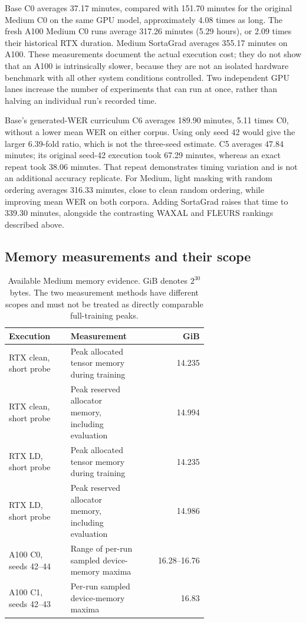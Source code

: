 \documentclass[12pt,a4paper]{report}
\begin{document}
Base C0 averages 37.17 minutes, compared with 151.70 minutes for the
original Medium C0 on the same GPU model, approximately 4.08 times as long.
The fresh A100 Medium C0 runs average 317.26 minutes (5.29 hours), or
2.09 times their historical RTX duration. Medium SortaGrad averages 355.17
minutes on A100. These measurements document the actual execution cost;
they do not show that an A100 is intrinsically slower, because they are not
an isolated hardware benchmark with all other system conditions controlled.
Two independent GPU lanes increase the number of experiments that can run
at once, rather than halving an individual run's recorded time.

Base's generated-WER curriculum C6 averages 189.90 minutes, 5.11 times
C0, without a lower mean WER on either corpus. Using only seed 42 would
give the larger 6.39-fold ratio, which is not the three-seed estimate.
C5 averages 47.84 minutes; its original seed-42 execution took 67.29 minutes,
whereas an exact repeat took 38.06 minutes. That repeat demonstrates timing
variation and is not an additional accuracy replicate. For Medium, light
masking with random ordering averages 316.33 minutes, close to clean random
ordering, while improving mean WER on both corpora. Adding SortaGrad raises
that time to 339.30 minutes, alongside the contrasting WAXAL and FLEURS
rankings described above.

\subsection{Memory measurements and their scope}

\begin{table}[htbp]\centering\small
\caption{Available Medium memory evidence. GiB denotes $2^{30}$ bytes.
The two measurement methods have different scopes and must not be treated
as directly comparable full-training peaks.}
\label{tab:memory}
\begin{tabular}{p{0.31\linewidth}p{0.36\linewidth}r}\toprule
Execution & Measurement & GiB\\\midrule
RTX clean, short probe & Peak allocated tensor memory during training & 14.235\\
RTX clean, short probe & Peak reserved allocator memory, including evaluation & 14.994\\
RTX LD, short probe & Peak allocated tensor memory during training & 14.235\\
RTX LD, short probe & Peak reserved allocator memory, including evaluation & 14.986\\
A100 C0, seeds 42--44 & Range of per-run sampled device-memory maxima & 16.28--16.76\\
A100 C1, seeds 42--43 & Per-run sampled device-memory maxima & 16.83\\
\bottomrule\end{tabular}\end{table}
\end{document}
